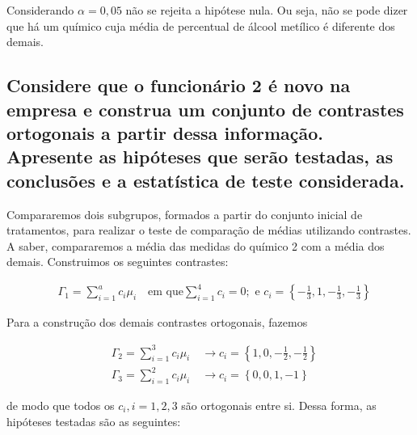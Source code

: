 \documentclass[
]{article}
\begin{document}
Considerando \(\alpha = 0,05\) não se rejeita a hipótese nula. Ou seja,
não se pode dizer que há um químico cuja média de percentual de álcool
metílico é diferente dos demais.

\hypertarget{considere-que-o-funcionuxe1rio-2-uxe9-novo-na-empresa-e-construa-um-conjunto-de-contrastes-ortogonais-a-partir-dessa-informauxe7uxe3o.-apresente-as-hipuxf3teses-que-seruxe3o-testadas-as-conclusuxf5es-e-a-estatuxedstica-de-teste-considerada.}{%
\subsection{Considere que o funcionário 2 é novo na empresa e construa
um conjunto de contrastes ortogonais a partir dessa informação.
Apresente as hipóteses que serão testadas, as conclusões e a estatística
de teste
considerada.}\label{considere-que-o-funcionuxe1rio-2-uxe9-novo-na-empresa-e-construa-um-conjunto-de-contrastes-ortogonais-a-partir-dessa-informauxe7uxe3o.-apresente-as-hipuxf3teses-que-seruxe3o-testadas-as-conclusuxf5es-e-a-estatuxedstica-de-teste-considerada.}}

Compararemos dois subgrupos, formados a partir do conjunto inicial de
tratamentos, para realizar o teste de comparação de médias utilizando
contrastes. A saber, compararemos a média das medidas do químico 2 com a
média dos demais. Construimos os seguintes contrastes:

\begin{align}
  &\Gamma_1 = \sum\limits_{i = 1}^{a} c_i \mu_i \quad \text{em que} \sum\limits_{i = 1}^{4} c_i = 0; \text{ e } c_i = \left\{-\frac{1}{3}, 1, -\frac{1}{3}, -\frac{1}{3}\right\}
\end{align}

Para a construção dos demais contrastes ortogonais, fazemos

\begin{align*}
  &\Gamma_2 = \sum\limits_{i = 1}^{3} c_i \mu_i \quad \longrightarrow
  c_i = \left\{1, 0, -\frac{1}{2}, -\frac{1}{2}\right\} \\
  &\Gamma_3 = \sum\limits_{i = 1}^{2} c_i \mu_i \quad \longrightarrow
  c_i = \left\{0, 0, 1, -1\right\}
\end{align*}

de modo que todos os \(c_i, i = 1, 2, 3\) são ortogonais entre si. Dessa
forma, as hipóteses testadas são as seguintes:
\end{document}
